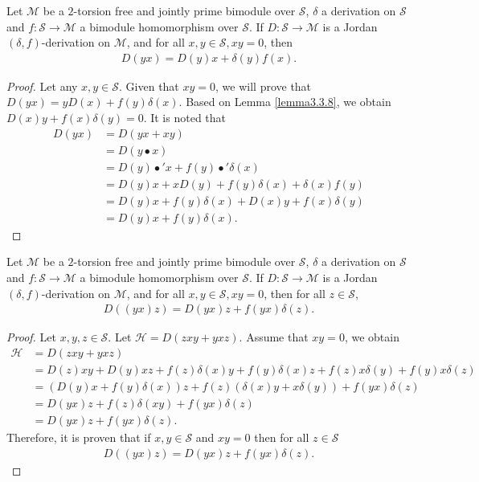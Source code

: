 \documentclass{arxiv}
\begin{document}
\begin{corollary}\label{cor3.3.1}
   Let $\mathcal{M}$ be a $2$-torsion free and jointly prime bimodule over $\mathcal{S}$, $\delta$ a derivation on $\mathcal{S}$ and $f : \mathcal{S} \rightarrow \mathcal{M}$ a bimodule homomorphism over $\mathcal{S}$. If $D:\mathcal{S} \rightarrow \mathcal{M}$ is a Jordan $(\delta,f)$-derivation on $\mathcal{M}$, and for all $x,y \in \mathcal{S}, xy=0$, then
    \begin{align*}
        D(yx)= D(y)x+\delta(y)f(x).
    \end{align*}
\end{corollary}
\begin{proof}
    Let any $x,y \in \mathcal{S}$. Given that $xy=0$, we will prove that $D(yx)=yD(x)+f(y)\delta(x)$. Based on Lemma \ref{lemma3.3.8}, we obtain $D(x)y+f(x)\delta(y)=0$. It is noted that
    \begin{align*}
        D(yx) &= D(yx+xy) \nonumber\\
        &=D(y \bullet x)\nonumber\\
        &=D(y) \bullet' x + f(y) \bullet' \delta (x)\nonumber\\
        &= D(y) x+xD(y) + f(y) \delta (x) + \delta(x)f(y)\nonumber\\
        &= D(y)x+f(y)\delta(x)+D(x)y+f(x)\delta(y)\\
        &= D(y)x+f(y)\delta(x).
    \end{align*}
\end{proof}

\begin{lemma}\label{lemma3.3.9}
     Let $\mathcal{M}$ be a $2$-torsion free and jointly prime bimodule over $\mathcal{S}$, $\delta$ a derivation on $\mathcal{S}$ and $f : \mathcal{S} \rightarrow \mathcal{M}$ a bimodule homomorphism over $\mathcal{S}$. If $D:\mathcal{S} \rightarrow \mathcal{M}$ is a Jordan $(\delta,f)$-derivation on $\mathcal{M}$, and for all $x,y \in \mathcal{S}, xy=0$, then for all $z \in \mathcal{S}$,
    \begin{align*}
        D((yx)z)=D(yx)z+f(yx)\delta(z).
    \end{align*}
\end{lemma}
\begin{proof}
    Let $x,y,z \in \mathcal{S}$. Let $\mathcal{H}=D(zxy+yxz)$. Assume that $xy=0$, we obtain
    \begin{align*}
        \mathcal{H} &= D(zxy + yxz)\\
        &= D(z)xy + D(y) xz + f(z)\delta (x)y + f(y)\delta(x)z + f(z)x\delta(y) + f(y) x \delta (z)\\
        &= (D(y)x + f(y)\delta(x))z + f(z)(\delta(x)y+x\delta(y))+f(yx)\delta(z)\\
        &= D(yx)z+f(z)\delta(xy) + f(yx)\delta(z)\\
        &= D(yx)z + f(yx)\delta(z).
    \end{align*}
    Therefore, it is proven that if $x,y \in \mathcal{S}$ and $xy=0$ then for all $z \in \mathcal{S}$
    \begin{align*}
        D((yx)z)=D(yx)z + f(yx)\delta(z).
    \end{align*}
\end{proof}
\end{document}
